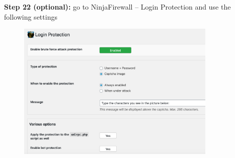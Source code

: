 \documentclass[a4paper]{article}
\begin{document}
\newpage

\noindent
\textbf{Step 22 (optional):} go to NinjaFirewall -- Login Protection and use the following settings

\begin{figure}[H]
  \centering
  \includegraphics[width=0.85\textwidth]{images/23.png}
\end{figure}

\end{document}
